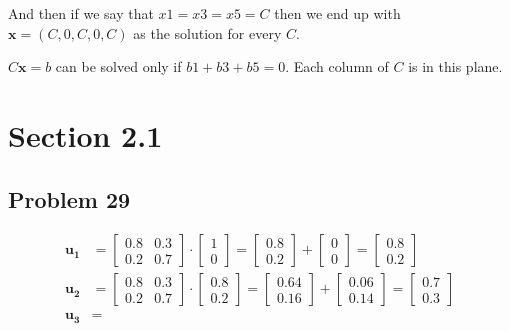 \documentclass[a4paper,11pt]{article}
\newcommand{\mybf}[1]{\boldsymbol{#1}}
\begin{document}
And then if we say that $x1=x3=x5=C$ then we end up with $\mybf{x}=(C, 0, C, 0, C)$ as the solution for every $C$.

$C\mybf{x}=b$ can be solved only if $b1+b3+b5=0$. Each column of $C$ is in this plane. 

\section*{Section 2.1}
\subsection*{Problem 29}

\begin{subequations}
\begin{align}
\mybf{u_1}&=
\begin{bmatrix}
0.8 & 0.3\\
0.2 & 0.7
\end{bmatrix}
\cdot
\begin{bmatrix}
1  \\
0 
\end{bmatrix}
=
\begin{bmatrix}
0.8  \\
0.2 
\end{bmatrix}
+
\begin{bmatrix}
0  \\
0 
\end{bmatrix}
=
\begin{bmatrix}
0.8  \\
0.2 
\end{bmatrix}
\\
\mybf{u_2}&=
\begin{bmatrix}
0.8 & 0.3\\
0.2 & 0.7
\end{bmatrix}
\cdot
\begin{bmatrix}
0.8  \\
0.2 
\end{bmatrix}
=
\begin{bmatrix}
0.64  \\
0.16 
\end{bmatrix}
+
\begin{bmatrix}
0.06  \\
0.14 
\end{bmatrix}
=
\begin{bmatrix}
0.7  \\
0.3 
\end{bmatrix}
\\
\mybf{u_3}&=

\end{align}
\end{subequations}
\end{document}
